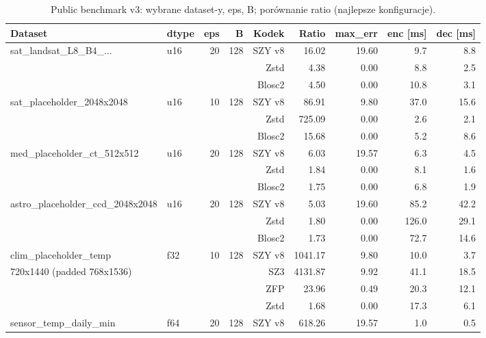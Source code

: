 \documentclass[11pt,a4paper]{article}
\begin{document}
\begin{table}[H]
\centering
\caption{Public benchmark v3: wybrane dataset-y, eps, B; porównanie ratio (najlepsze konfiguracje).}
\label{tab:public_bench_summary}
\begin{adjustbox}{max width=\textwidth}
\begin{tabular}{@{}llrrrrrrr@{}}
\toprule
Dataset & dtype & eps & B & Kodek & Ratio & max\_err & enc [ms] & dec [ms] \\
\midrule
sat\_landsat\_L8\_B4\_... & u16 & 20 & 128 & SZY v8  & 16.02 & 19.60 & 9.7 & 8.8 \\
                          &     &    &     & Zstd    &  4.38 & 0.00  & 8.8 & 2.5 \\
                          &     &    &     & Blosc2  &  4.50 & 0.00  &10.8 & 3.1 \\
\midrule
sat\_placeholder\_2048x2048 & u16 & 10 & 128 & SZY v8  & 86.91 & 9.80 & 37.0 & 15.6 \\
                            &     &    &     & Zstd    &725.09 & 0.00 & 2.6 & 2.1 \\
                            &     &    &     & Blosc2  &15.68 & 0.00 & 5.2 & 8.6 \\
\midrule
med\_placeholder\_ct\_512x512 & u16 & 20 & 128 & SZY v8 & 6.03 & 19.57 & 6.3 & 4.5 \\
                              &     &    &     & Zstd   & 1.84 & 0.00  & 8.1 & 1.6 \\
                              &     &    &     & Blosc2 & 1.75 & 0.00  & 6.8 & 1.9 \\
\midrule
astro\_placeholder\_ccd\_2048x2048 & u16 & 20 & 128 & SZY v8 & 5.03 & 19.60 & 85.2 & 42.2 \\
                                   &     &    &     & Zstd   & 1.80 & 0.00 &126.0 & 29.1 \\
                                   &     &    &     & Blosc2 & 1.73 & 0.00 & 72.7 & 14.6 \\
\midrule
clim\_placeholder\_temp & f32 & 10 & 128 & SZY v8 &1041.17 & 9.80 & 10.0 & 3.7 \\
720x1440 (padded 768x1536)     &     &    &     & SZ3    &4131.87 & 9.92 & 41.1 &18.5 \\
                               &     &    &     & ZFP    & 23.96 & 0.49 & 20.3 &12.1 \\
                               &     &    &     & Zstd   &  1.68 & 0.00 & 17.3 & 6.1 \\
\midrule
sensor\_temp\_daily\_min & f64 & 20 & 128 & SZY v8 &618.26 &19.57 & 1.0 & 0.5 \\

\end{tabular}
\end{adjustbox}
\end{table}
\end{document}
